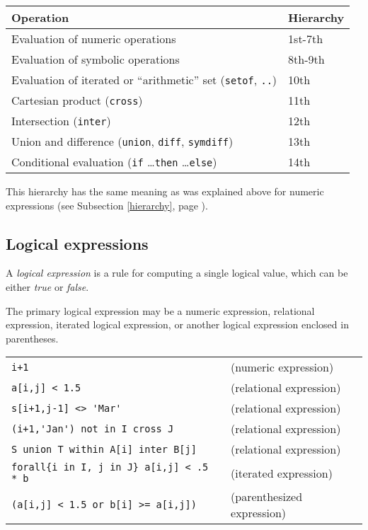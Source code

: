 \documentclass[10pt]{article}
\begin{document}
\noindent\hfil
\begin{tabular}{@{}ll@{}}
Operation&Hierarchy\\
\hline
Evaluation of numeric operations&1st-7th\\
Evaluation of symbolic operations&8th-9th\\
Evaluation of iterated or ``arithmetic'' set ({\tt setof}, {\tt..})&
10th\\
Cartesian product ({\tt cross})&11th\\
Intersection ({\tt inter})&12th\\
Union and difference ({\tt union}, {\tt diff}, {\tt symdiff})&13th\\
Conditional evaluation ({\tt if} \dots {\tt then} \dots {\tt else})&
14th\\
\end{tabular}

\medskip

This hierarchy has the same meaning as was explained above for numeric
expressions (see Subsection \ref{hierarchy}, page \pageref{hierarchy}).

\subsection{Logical expressions}

A {\it logical expression} is a rule for computing a single logical
value, which can be either {\it true} or {\it false}.

The primary logical expression may be a numeric expression, relational
expression, iterated logical expression, or another logical expression
enclosed in parentheses.

\medskip


\medskip

\noindent
\begin{tabular}{@{}ll@{}}
\verb|i+1|&(numeric expression)\\
\verb|a[i,j] < 1.5|&(relational expression)\\
\verb|s[i+1,j-1] <> 'Mar'|&(relational expression)\\
\verb|(i+1,'Jan') not in I cross J|&(relational expression)\\
\verb|S union T within A[i] inter B[j]|&(relational expression)\\
\verb|forall{i in I, j in J} a[i,j] < .5 * b|&(iterated expression)\\
\verb|(a[i,j] < 1.5 or b[i] >= a[i,j])|&(parenthesized expression)\\
\end{tabular}
\end{document}
